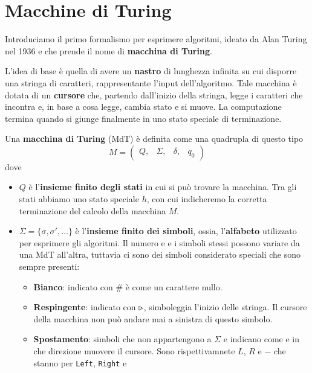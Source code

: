 \chapter{Macchine di Turing}
Introduciamo il primo formalismo per esprimere algoritmi, ideato
da Alan Turing nel 1936 e che prende il nome di
\textbf{macchina di Turing}.

L'idea di base è quella di avere un \textbf{nastro} di lunghezza
infinita su cui disporre una stringa di caratteri, rappresentante
l'input dell'algoritmo. Tale macchina è dotata di un
\textbf{cursore} che, partendo dall'inizio della stringa, legge
i caratteri che incontra e, in base a cosa legge, cambia stato
e si muove. La computazione termina quando si giunge finalmente
in uno stato speciale di terminazione.

\begin{definition}
	Una \textbf{macchina di Turing} (MdT) è definita come una
	quadrupla di questo tipo
	\[
		M = \begin{pmatrix}
			Q, & \Sigma, & \delta, & q_0
		\end{pmatrix}
	\]
	dove
	\begin{itemize}
		\item $Q$ è l'\textbf{insieme finito degli stati} in
		      cui si può trovare la macchina. Tra gli stati
		      abbiamo uno stato speciale $h$, con cui
		      indicheremo la corretta terminazione del calcolo
		      della macchina $M$.
		\item $\Sigma = \{ \sigma, \sigma', \dots \}$ è
		      l'\textbf{insieme finito dei simboli}, ossia,
		      l'\textbf{alfabeto} utilizzato per esprimere
		      gli algoritmi. Il numero e e i simboli stessi
		      possono variare da una MdT all'altra, tuttavia
		      ci sono dei simboli considerato speciali che sono
		      sempre presenti:
		      \begin{itemize}
			      \item \textbf{Bianco}: indicato con $\#$ è
			            come un carattere nullo.
			      \item \textbf{Respingente}: indicato con
			            $\triangleright$, simboleggia l'inizio delle
			            stringa. Il cursore della macchina non
			            può andare mai a sinistra di questo
			            simbolo.
			      \item \textbf{Spostamento}: simboli che non
			            appartengono a $\Sigma$ e indicano come
			            e in che direzione muovere il cursore.
			            Sono rispettivamnete $L$, $R$ e $-$ che
			            stanno per \verb|Left|, \verb|Right| e

\end{itemize}
\end{itemize}
\end{definition}
